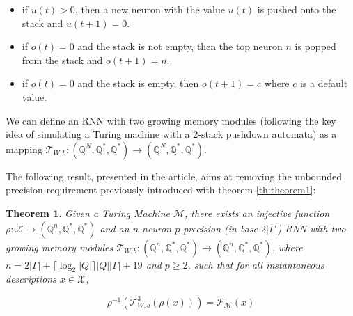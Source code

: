 \documentclass{article}
\newtheorem{theorem}{Theorem}
\begin{document}
\begin{itemize}
    \item if $u(t) > 0$, then a new neuron with the value $u(t)$ is pushed onto the stack and $u(t+1) = 0$.
    \item if $o(t) = 0$ and the stack is not empty, then the top neuron $n$ is popped from the stack and $o(t+1) = n$.
    \item if $o(t) = 0$ and the stack is empty, then $o(t+1) = c$ where $c$ is a default value.
\end{itemize}

We can define an RNN with two growing memory modules (following the key idea of simulating a Turing machine with a 2-stack pushdown automata) as a mapping $\mathcal{T}_{W,b}:(\mathbb{Q}^N,\mathbb{Q}^*,\mathbb{Q}^*) \rightarrow (\mathbb{Q}^N,\mathbb{Q}^*,\mathbb{Q}^*)$.

The following result, presented in the article, aims at removing the unbounded precision requirement previously introduced with theorem \ref{th:theorem1}:

\begin{theorem}\label{th:theorem2}
    Given a Turing Machine $\mathcal{M}$, there exists an injective function $\rho:\mathcal{X} \rightarrow (\mathbb{Q}^n, \mathbb{Q}^*, \mathbb{Q}^*)$ and an $n$-neuron $p$-precision (in base $2|\Gamma|$) RNN with two growing memory modules $\mathcal{T}_{W,b}:(\mathbb{Q}^n, \mathbb{Q}^*, \mathbb{Q}^*) \rightarrow (\mathbb{Q}^n, \mathbb{Q}^*, \mathbb{Q}^*)$, where $n=2|\Gamma|+\lceil \log_2|Q|\rceil |Q||\Gamma| + 19$ and $p \geq 2$, such that for all instantaneous descriptions $x \in \mathcal{X}$,
    
    $$\rho^{-1}(\mathcal{T}^3_{W,b}(\rho(x))) = \mathcal{P}_{\mathcal{M}}(x)$$
\end{theorem}
\end{document}

